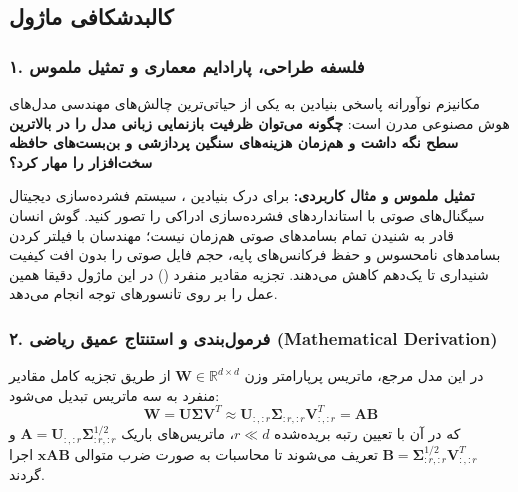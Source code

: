 \subsection{کالبدشکافی ماژول }

\subsubsection*{۱. فلسفه طراحی، پارادایم معماری و تمثیل ملموس}
مکانیزم نوآورانه  پاسخی بنیادین به یکی از حیاتی‌ترین چالش‌های مهندسی مدل‌های هوش مصنوعی مدرن است: \textbf{چگونه می‌توان ظرفیت بازنمایی زبانی مدل را در بالاترین سطح نگه داشت و هم‌زمان هزینه‌های سنگین پردازشی و بن‌بست‌های حافظه سخت‌افزار را مهار کرد؟}

\textbf{تمثیل ملموس و مثال کاربردی:}
برای درک بنیادین ، سیستم فشرده‌سازی دیجیتال سیگنال‌های صوتی با استانداردهای فشرده‌سازی ادراکی را تصور کنید. گوش انسان قادر به شنیدن تمام بسامدهای صوتی هم‌زمان نیست؛ مهندسان با فیلتر کردن بسامدهای نامحسوس و حفظ فرکانس‌های پایه، حجم فایل صوتی را بدون افت کیفیت شنیداری تا یک‌دهم کاهش می‌دهند. تجزیه مقادیر منفرد () در این ماژول دقیقا همین عمل را بر روی تانسورهای توجه انجام می‌دهد.

\subsubsection*{۲. فرمول‌بندی و استنتاج عمیق ریاضی (Mathematical Derivation)}
در این مدل مرجع، ماتریس پرپارامتر وزن $\mathbf{W} \in \mathbb{R}^{d \times d}$ از طریق تجزیه کامل مقادیر منفرد به سه ماتریس تبدیل می‌شود:
\begin{equation}
\mathbf{W} = \mathbf{U} \mathbf{\Sigma} \mathbf{V}^T \approx \mathbf{U}_{:,:r} \mathbf{\Sigma}_{:r,:r} \mathbf{V}_{:,:r}^T = \mathbf{A} \mathbf{B}
\end{equation}
که در آن با تعیین رتبه بریده‌شده $r \ll d$، ماتریس‌های باریک $\mathbf{A} = \mathbf{U}_{:,:r} \mathbf{\Sigma}_{:r,:r}^{1/2}$ و $\mathbf{B} = \mathbf{\Sigma}_{:r,:r}^{1/2} \mathbf{V}_{:,:r}^T$ تعریف می‌شوند تا محاسبات به صورت ضرب متوالی $\mathbf{x} \mathbf{A} \mathbf{B}$ اجرا گردند.

